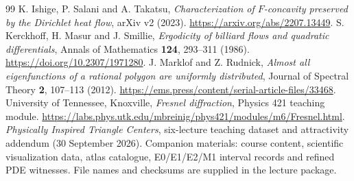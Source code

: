 \documentclass[11pt,oneside,openany]{book}
\begin{document}
\begin{thebibliography}{99}
 K. Ishige, P. Salani and A. Takatsu,
\emph{Characterization of $F$-concavity preserved by the Dirichlet
heat flow}, arXiv v2 (2023).
\url{https://arxiv.org/abs/2207.13449}.
 S. Kerckhoff, H. Masur and J. Smillie,
\emph{Ergodicity of billiard flows and quadratic differentials},
Annals of Mathematics \textbf{124}, 293--311 (1986).
\url{https://doi.org/10.2307/1971280}.
 J. Marklof and Z. Rudnick,
\emph{Almost all eigenfunctions of a rational polygon are uniformly
distributed}, Journal of Spectral Theory \textbf{2}, 107--113 (2012).
\url{https://ems.press/content/serial-article-files/33468}.
 University of Tennessee, Knoxville,
\emph{Fresnel diffraction}, Physics 421 teaching module.
\url{https://labs.phys.utk.edu/mbreinig/phys421/modules/m6/Fresnel.html}.
 \emph{Physically Inspired Triangle Centers},
six-lecture teaching dataset and attractivity addendum
(30 September 2026). Companion materials:
course content, scientific visualization data, atlas catalogue,
E0/E1/E2/M1 interval records and refined PDE witnesses.
File names and checksums are supplied in the lecture package.
\end{thebibliography}
\end{document}
